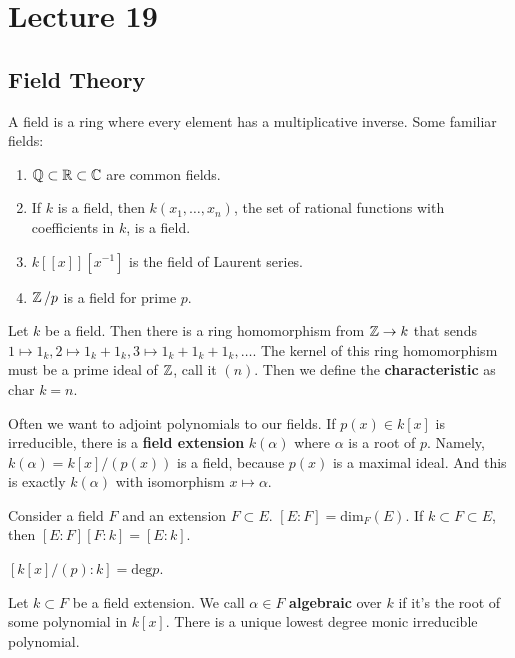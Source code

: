 \section{Lecture 19}
\subsection{Field Theory}
A field is a ring where every element has a multiplicative inverse.
Some familiar fields:
\begin{enumerate}
    \item $\operatorname{\mathbb{Q}} \subset \operatorname{\mathbb{R}} \subset \operatorname{\mathbb{C}}$ are common fields.
    \item If $k$ is a field, then $k(x_1, \dots, x_n)$,
    the set of rational functions with coefficients in $k$,
    is a field.
    \item $k[[x]][x^{-1}]$ is the field of Laurent series.
    \item $\operatorname{\mathbb{Z}}/p$ is a field for prime $p$.
\end{enumerate}

\begin{definition}
    Let $k$ be a field. Then
    there is a ring homomorphism from $\operatorname{\mathbb{Z}} \to k$
    that sends $1 \mapsto 1_k, 2 \mapsto 1_k + 1_k, 3 \mapsto 1_k + 1_k + 1_k, \dots$.
    The kernel of this ring homomorphism must be a prime ideal of $\operatorname{\mathbb{Z}}$,
    call it $(n)$. Then we define the \textbf{characteristic} as $\text{char } k = n$.
\end{definition}

Often we want to adjoint polynomials to our fields.
If $p(x) \in k[x]$ is irreducible,
there is a \textbf{field extension} $k(\alpha)$
where $\alpha$ is a root of $p$. Namely,
$k(\alpha) = k[x]/(p(x))$ is a field, because $p(x)$ is a maximal ideal.
And this is exactly $k(\alpha)$ with isomorphism $x \mapsto \alpha$.
\begin{definition}
    Consider a field $F$ and an extension $F \subset E$. $[E : F] = \text{dim}_F(E)$.
    If $k \subset F \subset E$, then $[E: F][F: k] = [E: k]$.
\end{definition}

\begin{theorem}
    $[k[x]/(p) : k] = \text{deg} p$.
\end{theorem}

\begin{definition}
    Let $k \subset F$ be a field extension.
    We call $\alpha \in F$ \textbf{algebraic} over $k$ if it's the root of some polynomial in $k[x]$.
    There is a unique lowest degree monic irreducible polynomial.  
\end{definition}

